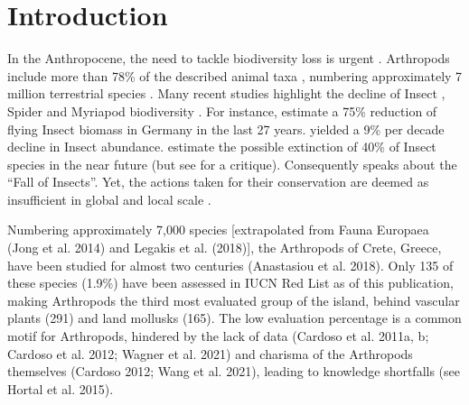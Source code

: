 \section{Introduction}
\label{sec:arthropods-intro}

In the Anthropocene, the need to tackle biodiversity loss is urgent \parencite{johnson2017biodiversity, meng2021biodiversity}.
Arthropods include more than 78\% of the described animal taxa \parencite{zhang2013animal},
numbering approximately 7 million terrestrial species \parencite{stork2018how-many}. Many recent
studies highlight the decline of Insect \parencite{cardoso2020scientists, wagner2020insect, raven2021agricultural},
Spider \parencite{potapov2020functional, branco2020an-expert-based} and Myriapod biodiversity \parencite{karam-gemael2018why-be-red-listed, iniesta2023where}.
For instance, \textcite{hallmann2017more} estimate a 75\% reduction of flying Insect
biomass in Germany in the last 27 years. \textcite{klink2020meta-analysis} yielded a 9\% per
decade decline in Insect abundance. \textcite{sanchez-bayo2019worldwide} estimate
the possible extinction of 40\% of Insect species in the near future (but see
\textcite{wagner2019global} for a critique). Consequently \textcite{samways2019insect} speaks about the “Fall of Insects”.
Yet, the actions taken for their conservation are deemed as insufficient in
global and local scale \parencite{cardoso2012the-underrepresentation, damen2013protected, chowdhury2023three-quarters}.

Numbering approximately 7,000 species [extrapolated from Fauna Europaea
(Jong et al. 2014) and Legakis et al. (2018)], the Arthropods of Crete, Greece,
have been studied for almost two centuries (Anastasiou et al. 2018).
Only 135 of these species (1.9\%) have been assessed in IUCN Red List as of
this publication, making Arthropods the third most evaluated group of the
island, behind vascular plants (291) and land mollusks (165). The low
evaluation percentage is a common motif for Arthropods, hindered by the lack of
data (Cardoso et al. 2011a, b; Cardoso et al. 2012; Wagner et al. 2021) and
charisma of the Arthropods themselves (Cardoso 2012; Wang et al. 2021), leading
to knowledge shortfalls (see Hortal et al. 2015).

